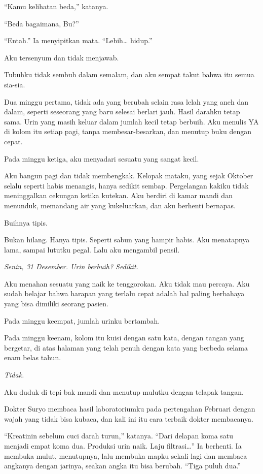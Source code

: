 \documentclass[11pt,twoside,openany]{book}
\makeatletter
\newcommand{\scenebreak}{\par\vspace{0.9em}{\centering\textsc{*\hspace{0.7em}*\hspace{0.7em}*}\par}\vspace{0.9em}\@afterindentfalse\@afterheading}
\makeatother
\begin{document}
``Kamu kelihatan beda,'' katanya.

``Beda bagaimana, Bu?''

``Entah.'' Ia menyipitkan mata. ``Lebih\ldots{} hidup.''

Aku tersenyum dan tidak menjawab.

\scenebreak
Tubuhku tidak sembuh dalam semalam, dan aku sempat takut bahwa itu semua sia-sia.

Dua minggu pertama, tidak ada yang berubah selain rasa lelah yang aneh dan dalam, seperti seseorang yang baru selesai berlari jauh. Hasil darahku tetap sama. Urin yang masih keluar dalam jumlah kecil tetap berbuih. Aku menulis YA di kolom itu setiap pagi, tanpa membesar-besarkan, dan menutup buku dengan cepat.

Pada minggu ketiga, aku menyadari sesuatu yang sangat kecil.

Aku bangun pagi dan tidak membengkak. Kelopak mataku, yang sejak Oktober selalu seperti habis menangis, hanya sedikit sembap. Pergelangan kakiku tidak meninggalkan cekungan ketika kutekan. Aku berdiri di kamar mandi dan menunduk, memandang air yang kukeluarkan, dan aku berhenti bernapas.

Buihnya tipis.

Bukan hilang. Hanya tipis. Seperti sabun yang hampir habis. Aku menatapnya lama, sampai lututku pegal. Lalu aku mengambil pensil.

\emph{Senin, 31 Desember. Urin berbuih? Sedikit.}

Aku menahan sesuatu yang naik ke tenggorokan. Aku tidak mau percaya. Aku sudah belajar bahwa harapan yang terlalu cepat adalah hal paling berbahaya yang bisa dimiliki seorang pasien.

Pada minggu keempat, jumlah urinku bertambah.

Pada minggu keenam, kolom itu kuisi dengan satu kata, dengan tangan yang bergetar, di atas halaman yang telah penuh dengan kata yang berbeda selama enam belas tahun.

\emph{Tidak.}

Aku duduk di tepi bak mandi dan menutup mulutku dengan telapak tangan.

\scenebreak
Dokter Suryo membaca hasil laboratoriumku pada pertengahan Februari dengan wajah yang tidak bisa kubaca, dan kali ini itu cara terbaik dokter membacanya.

``Kreatinin sebelum cuci darah turun,'' katanya. ``Dari delapan koma satu menjadi empat koma dua. Produksi urin naik. Laju filtrasi\ldots{}'' Ia berhenti. Ia membuka mulut, menutupnya, lalu membuka mapku sekali lagi dan membaca angkanya dengan jarinya, seakan angka itu bisa berubah. ``Tiga puluh dua.''
\end{document}
